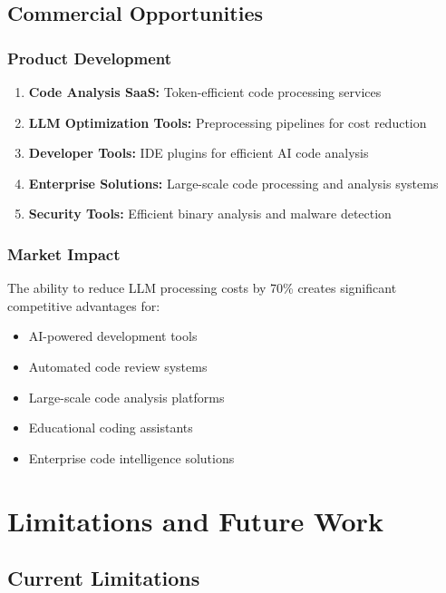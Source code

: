 \documentclass[11pt,a4paper]{article}
\begin{document}
\subsection{Commercial Opportunities}

\subsubsection{Product Development}
\begin{enumerate}
    \item \textbf{Code Analysis SaaS:} Token-efficient code processing services
    \item \textbf{LLM Optimization Tools:} Preprocessing pipelines for cost reduction  
    \item \textbf{Developer Tools:} IDE plugins for efficient AI code analysis
    \item \textbf{Enterprise Solutions:} Large-scale code processing and analysis systems
    \item \textbf{Security Tools:} Efficient binary analysis and malware detection
\end{enumerate}

\subsubsection{Market Impact}
The ability to reduce LLM processing costs by 70\% creates significant competitive advantages for:
\begin{itemize}
    \item AI-powered development tools
    \item Automated code review systems
    \item Large-scale code analysis platforms
    \item Educational coding assistants
    \item Enterprise code intelligence solutions
\end{itemize}

\section{Limitations and Future Work}

\subsection{Current Limitations}
\end{document}
